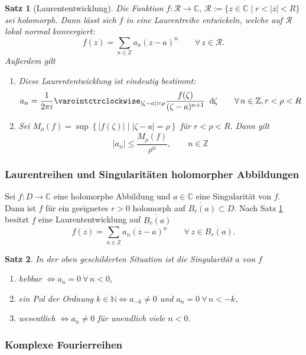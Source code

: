 \documentclass[a4paper,12pt]{article}
\theoremstyle{newthm}
\newtheorem{thm}{Satz}[subsection]
\theoremstyle{newdef}
\theoremstyle{newrem}
\newcommand{\N}{\mathbb{N}}
\newcommand{\Z}{\mathbb{Z}}
\newcommand{\C}{\mathbb{C}}
\renewcommand{\d}{\ \operatorname{d}\hspace{-2px}}
\begin{document}
		\begin{thm}[Laurententwicklung]\label{3.3.4}
			Die Funktion $ f: \mathcal{R} \to \C,\ \mathcal{R} := \{z \in \C \mid r < |z| < R\} $ sei holomorph. Dann lässt sich $f$ in eine Laurentreihe entwickeln, welche auf $\mathcal{R}$ lokal normal konvergiert: 
			\[ f(z) = \sum_{n \in \Z} a_n (z-a)^n \qquad \forall\, z \in \mathcal{R}. \]
			Außerdem gilt
			\begin{enumerate}[label={\roman*})]
				\item Diese Laurententwicklung ist eindeutig bestimmt:
				\[ a_n = \frac{1}{2\pi i} \varointctrclockwise_{|\zeta - a| = \rho} \frac{f(\zeta)}{(\zeta - a)^{n+1}}\d\zeta \qquad \forall\, n \in \Z, r < \rho < R \]
				\item Sei $ M_\rho (f) = \sup \left\{|f(\zeta)| \mid |\zeta-a| = \rho \right\} $ für $ r < \rho < R. $ Dann gilt 
				\[ |a_n| \leq \frac{M_\rho(f)}{\rho^n}, \qquad n \in \Z \]
			\end{enumerate}
		\end{thm}
		
		\subsubsection*{Laurentreihen und Singularitäten holomorpher Abbildungen}
		
		Sei $ f: D \to \C $ eine holomorphe Abbildung und $a \in \C$ eine Singularität von $f$. Dann ist $f$ für ein geeignetes $ r > 0$ holomorph auf $ \dot{B_r(a)} \subset D $. Nach Satz \ref{3.3.4} besitzt $f$ eine Laurententwicklung auf $ \dot{B_r(a)} $
		\[ f(z) = \sum_{n \in \Z} a_n(z-a)^n\qquad \forall\, z \in \dot{B_r(a)}. \] 
		
		\begin{thm}\label{3.3.5}
			In der oben geschilderten Situation ist die Singularität $a$ von $f$
			\begin{enumerate}[label={\roman*})]
				\item \emph{hebbar} $\iff a_n = 0 \ \forall\, n<0$,
				\item ein \emph{Pol} der Ordnung $k \in \N \iff a_{-k} \neq 0 $ und $a_n=0 \ \forall\, n < -k$,
				\item \emph{wesentlich} $\iff a_n \neq 0$ für unendlich viele $n < 0$.
			\end{enumerate}
		\end{thm}
		
		\subsubsection*{Komplexe Fourierreihen}
		
\end{document}
